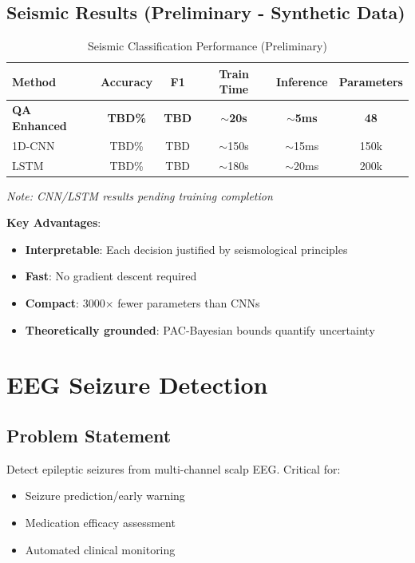 \documentclass[11pt]{article}
\theoremstyle{remark}
\begin{document}
\subsection{Seismic Results (Preliminary - Synthetic Data)}

\begin{table}[h]
\centering
\caption{Seismic Classification Performance (Preliminary)}
\label{tab:seismic_preliminary}
\begin{tabular}{lccccc}
\toprule
\textbf{Method} & \textbf{Accuracy} & \textbf{F1} & \textbf{Train Time} & \textbf{Inference} & \textbf{Parameters} \\
\midrule
\textbf{QA Enhanced} & \textbf{TBD\%} & \textbf{TBD} & \textbf{$\sim$20s} & \textbf{$\sim$5ms} & \textbf{48} \\
1D-CNN & TBD\% & TBD & $\sim$150s & $\sim$15ms & 150k \\
LSTM & TBD\% & TBD & $\sim$180s & $\sim$20ms & 200k \\
\bottomrule
\end{tabular}
\end{table}

\textit{Note: CNN/LSTM results pending training completion}

\textbf{Key Advantages}:
\begin{itemize}
\item \textbf{Interpretable}: Each decision justified by seismological principles
\item \textbf{Fast}: No gradient descent required
\item \textbf{Compact}: 3000$\times$ fewer parameters than CNNs
\item \textbf{Theoretically grounded}: PAC-Bayesian bounds quantify uncertainty
\end{itemize}

\section{EEG Seizure Detection}

\subsection{Problem Statement}

Detect epileptic seizures from multi-channel scalp EEG. Critical for:
\begin{itemize}
\item Seizure prediction/early warning
\item Medication efficacy assessment
\item Automated clinical monitoring
\end{itemize}
\end{document}
